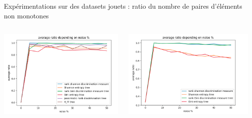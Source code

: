 \documentclass[usenames,dvipsnames]{beamer}
\begin{document}
\begin{frame}{Expérimentations sur des datasets jouets : ratio du nombre de paires d'éléments non monotones}
    \begin{columns}
        \begin{column}{0.45\textwidth}
            \centering
            \includegraphics[width=\textwidth]{ratio_2.png}
        \end{column}
        \begin{column}{0.45\textwidth}
            \centering
            \includegraphics[width=\textwidth]{ratio_3.png}
        \end{column}
    \end{columns}
    \begin{columns}
        \begin{column}{0.45\textwidth}
            \centering

\end{column}
\end{columns}
\end{frame}
\end{document}
